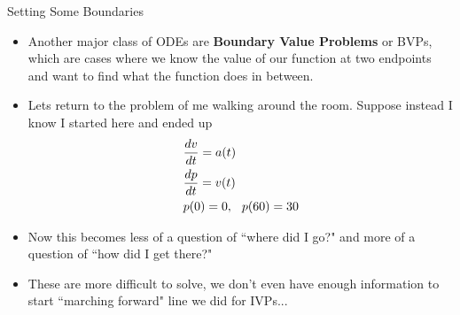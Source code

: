 {}\documentclass[letterpaper,
compress,
xcolor=x11names,
]{beamer}
\begin{document}
\begin{frame}{Setting Some Boundaries}
	\footnotesize
	\begin{itemize}
		\item Another major class of ODEs are \textbf{Boundary Value Problems} or BVPs, which are cases where we know the value of our function at two endpoints and want to find what the function does in between.
		\item Lets return to the problem of me walking around the room. Suppose instead I know I started here and ended up 
		\begin{align*}
			&\frac{dv}{dt} = a(t) \\
			&\frac{dp}{dt} = v(t) \\
			&p(0) = 0,\hspace{0.25cm} p(60) = 30
		\end{align*}
		\item Now this becomes less of a question of ``where did I go?" and more of a question of ``how did I get there?"
		\item These are more difficult to solve, we don't even have enough information to start ``marching forward" line we did for IVPs...
	\end{itemize}
\end{frame}

\end{document}
